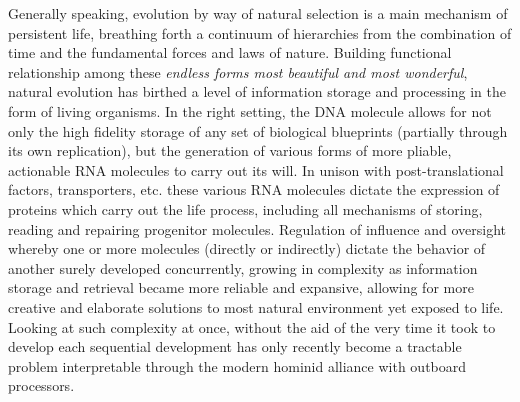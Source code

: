 Generally speaking, evolution by way of natural selection is a main mechanism of persistent life, breathing forth a continuum of hierarchies from the combination of time and the fundamental forces and laws of nature. Building functional relationship among these \emph{endless forms most beautiful and most wonderful}\citep{darwin1869origin}, natural evolution has birthed a level of information storage and processing in the form of living organisms. In the right setting, the DNA molecule allows for not only the high fidelity storage of any set of biological blueprints (partially through its own replication), but the generation of various forms of more pliable, actionable RNA molecules to carry out its will. In unison with post-translational factors, transporters, etc. these various RNA molecules dictate the expression of proteins which carry out the life process, including all mechanisms of storing, reading and repairing progenitor molecules. Regulation of influence and oversight whereby one or more molecules (directly or indirectly) dictate the behavior of another surely developed concurrently, growing in complexity as information storage and retrieval became more reliable and expansive, allowing for more creative and elaborate solutions to most natural environment yet exposed to life. Looking at such complexity at once, without the aid of the very time it took to develop each sequential development has only recently become a tractable problem interpretable through the modern hominid alliance with outboard processors.


